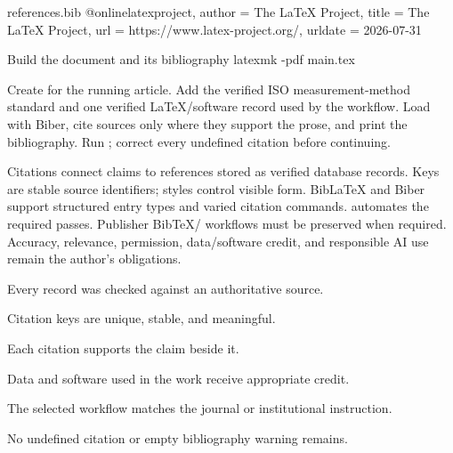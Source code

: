 \begin{latexcode}{references.bib}
@online{latexproject,
  author  = {{The \LaTeX{} Project}},
  title   = {The \LaTeX{} Project},
  url     = {https://www.latex-project.org/},
  urldate = {2026-07-31}
}
\end{latexcode}

\begin{terminalcode}{Build the document and its bibliography}
latexmk -pdf main.tex
\end{terminalcode}

\chapterproject

\begin{miniproject}
Create  for the running article. Add the verified ISO
measurement-method standard and one verified \LaTeX{}/software record used by the
workflow. Load  with Biber, cite sources only where they support
the prose, and print the bibliography. Run ; correct every
undefined citation before continuing.
\end{miniproject}

\chaptersummary

Citations connect claims to references stored as verified database records.
Keys are stable source identifiers; styles control visible form. Bib\LaTeX{} and
Biber support structured entry types and varied citation commands.
 automates the required passes. Publisher BibTeX/
workflows must be preserved when required. Accuracy, relevance, permission,
data/software credit, and responsible AI use remain the author's obligations.

\chaptercheck
\begin{chapterchecklist}
  \item Every record was checked against an authoritative source.
  \item Citation keys are unique, stable, and meaningful.
  \item Each citation supports the claim beside it.
  \item Data and software used in the work receive appropriate credit.
  \item The selected workflow matches the journal or institutional instruction.
  \item No undefined citation or empty bibliography warning remains.
\end{chapterchecklist}

